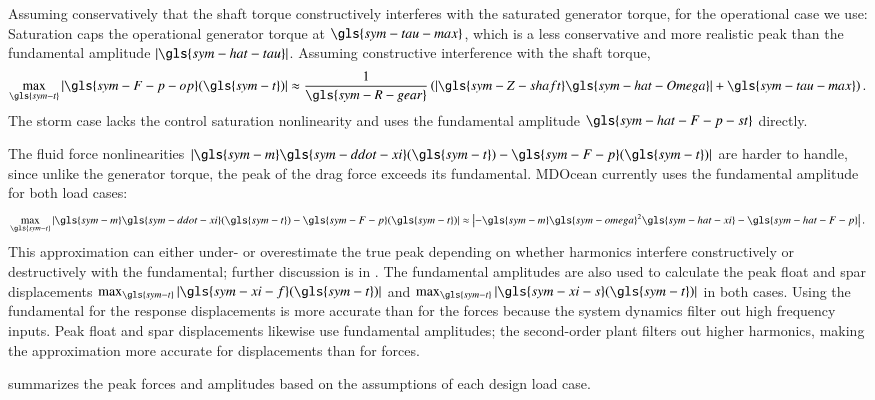     Assuming conservatively that the shaft torque constructively interferes with the saturated generator torque, for the operational case we use:
\else
    Saturation caps the operational generator torque at $\gls{sym-tau-max}$, which is a less conservative and more realistic peak than the fundamental amplitude $|\gls{sym-hat-tau}|$.
    Assuming constructive interference with the shaft torque,
\fi
\begin{equation}\label{eq:peak-pto-force}
\max_{\gls{sym-t}} | \gls{sym-F-p-op} (\gls{sym-t}) |
\approx \frac{1}{\gls{sym-R-gear}}
\left(
\left| \gls{sym-Z-shaft} \gls{sym-hat-Omega} \right|
                         + \gls{sym-tau-max} \right).
\end{equation}
The storm case lacks the control saturation nonlinearity and uses the fundamental amplitude $\gls{sym-hat-F-p-st}$ directly.

The fluid force nonlinearities $|\gls{sym-m}\gls{sym-ddot-xi}(\gls{sym-t})-\gls{sym-F-p}(\gls{sym-t})|$ are harder to handle, since unlike the generator torque, the peak of the drag force exceeds its fundamental.
MDOcean currently uses the fundamental amplitude for both load cases:
\begin{equation}\label{eq:peak-fluid-force}
\max_{\gls{sym-t}} \left|\gls{sym-m}\gls{sym-ddot-xi}(\gls{sym-t}) - \gls{sym-F-p}(\gls{sym-t})\right| \approx \left|-\gls{sym-m}\gls{sym-omega}^2 \gls{sym-hat-xi} - \gls{sym-hat-F-p}\right|.
\end{equation}
This approximation can either under- or overestimate the true peak depending on whether harmonics interfere constructively or destructively with the fundamental; further discussion is in .
\ifdefined\DISSERTATION
    The fundamental amplitudes are also used to calculate the peak float and spar displacements $\max_{\gls{sym-t}} |\gls{sym-xi-f}(\gls{sym-t})|$ and $\max_{\gls{sym-t}} |\gls{sym-xi-s}(\gls{sym-t})|$ in both cases.
    Using the fundamental for the response displacements is more accurate than for the forces because the system dynamics filter out high frequency inputs.
\else
    Peak float and spar displacements likewise use fundamental amplitudes; the second-order plant filters out higher harmonics, making the approximation more accurate for displacements than for forces.
\fi

 summarizes the peak forces and amplitudes based on the assumptions of each design load case.


